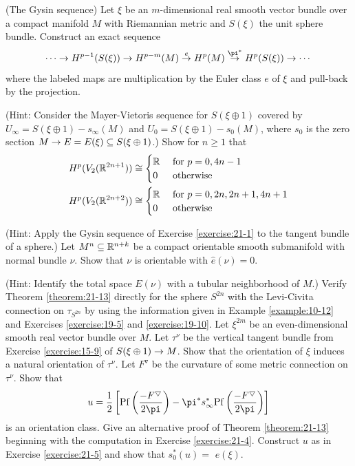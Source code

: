\begin{enumerate}[\theexercise.1]
  \newchap[21]
  \NewItem (The Gysin sequence) Let $\xi$ be an $m$-dimensional real smooth vector bundle over a compact manifold $M$ with Riemannian metric and $S( \xi )$ the unit sphere bundle. Construct an exact sequence
    \[
      \cdots  \ra  {H}^{p- 1}( {S( \xi ) })  \ra  {H}^{p- m}( M) \overset{e}{ \ra  }{H}^{p}( M) \overset{{\pi }^*}{ \ra  }{H}^{p}( {S( \xi ) })  \ra  \cdots
    \]
    where the labeled maps are multiplication by the Euler class $e$ of $\xi$ and pull-back by the projection. \par(Hint: Consider the Mayer-Vietoris sequence for $S( {\xi  \oplus  1})$ covered by ${U}_{\infty } = S( {\xi  \oplus  1}) - {s}_{\infty }( M)$ and ${U}_{0} = S( {\xi  \oplus  1}) - {s}_{0}( M)$, where ${s}_{0}$ is the zero section $M \rightarrow  E = E( \xi )  \subseteq  S( {\xi  \oplus  1})$.)
  \NewItem Show for $n \geq  1$ that
    \[
    \begin{aligned}
      {H}^{p}( {{V}_{2}( {\mathbb{R}}^{{2n} + 1}) })  
      & \cong \begin{cases} 
        \mathbb{R} & \text{ for } p = 0,{4n}- 1 \\  
        0     & \text{ otherwise } 
      \end{cases} \\
      {H}^{p}( {{V}_{2}( {\mathbb{R}}^{{2n} + 2}) })  
      & \cong \begin{cases} 
        \mathbb{R} & \text{ for } p = 0,{2n},{2n} + 1,{4n} + 1 \\  
        0     & \text{ otherwise } 
      \end{cases}
    \end{aligned}
    \]
    \par(Hint: Apply the Gysin sequence of Exercise \ref{exercise:21-1} to the tangent bundle of a sphere.)
  \NewItem Let ${M}^{n} \subseteq  {\ensuremath{\mathbb{R}}}^{n + k}$ be a compact orientable smooth submanifold with normal bundle $\nu$. Show that $\nu$ is orientable with $\hat{e}( \nu )  = 0$.
    \par(Hint: Identify the total space $E( \nu )$ with a tubular neighborhood of $M$.)
  \NewItem Verify Theorem \ref{theorem:21-13} directly for the sphere ${S}^{2n}$ with the Levi-Civita connection on ${\tau }_{{S}^{2n}}$ by using the information given in Example \ref{example:10-12} and Exercises \ref{exercise:19-5} and \ref{exercise:19-10}.
    \NewItem Let ${\xi }^{2m}$ be an even-dimensional smooth real vector bundle over $M$. Let ${\tau }^{\nu }$ be the vertical tangent bundle from Exercise \ref{exercise:15-9} of $S( {\xi  \oplus  1})  \rightarrow  M$. Show that the orientation of $\xi$ induces a natural orientation of ${\tau }^{\nu }$. Let ${F}^{ \triangledown  }$ be the curvature of some metric connection on ${\tau }^{\nu }$. Show that
    \[
      u = \frac{1}{2}\left[\R{Pf}\left( \frac{-F^\btd }{2\pi }\right) - {\pi }^*{s}_{\infty }^*\R{Pf}\left( \frac{-F^\btd }{2\pi }\right)\right]
    \]
    is an orientation class.
  \NewItem Give an alternative proof of Theorem \ref{theorem:21-13} beginning with the computation in Exercise \ref{exercise:21-4}. Construct $u$ as in Exercise \ref{exercise:21-5} and show that ${s}_{0}^*( u)  =$  $e( \xi )$.
\end{enumerate}

